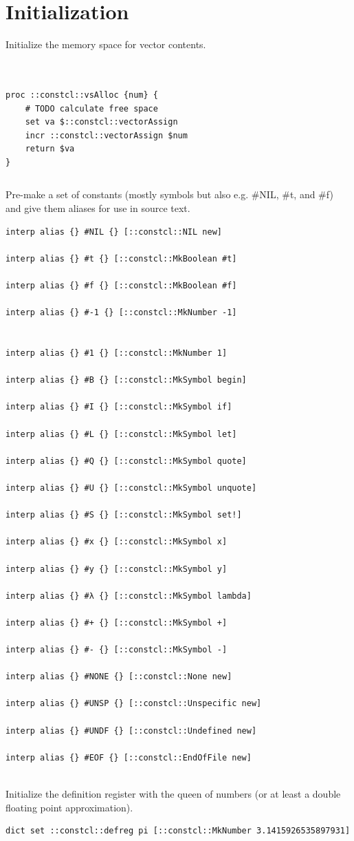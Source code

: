 \documentclass[twoside,9pt]{report}
\begin{document}
\section{Initialization}
\label{initialization}

Initialize the memory space for vector contents.

\noindent\makebox[\linewidth]{\rule{\linewidth}{0.4pt}}
\begin{lstlisting}
 
 
proc ::constcl::vsAlloc {num} {
    # TODO calculate free space
    set va $::constcl::vectorAssign
    incr ::constcl::vectorAssign $num
    return $va
}
\end{lstlisting}
\noindent\makebox[\linewidth]{\rule{\linewidth}{0.4pt}}
\noindent\makebox[\linewidth]{\rule{\linewidth}{0.4pt}}
\begin{lstlisting}
\end{lstlisting}
\noindent\makebox[\linewidth]{\rule{\linewidth}{0.4pt}}

Pre-make a set of constants (mostly symbols but also e.g. \#NIL, \#t, and \#f) and give them aliases for use in source text.

\noindent\makebox[\linewidth]{\rule{\linewidth}{0.4pt}}
\begin{lstlisting}
interp alias {} #NIL {} [::constcl::NIL new]
 
interp alias {} #t {} [::constcl::MkBoolean #t]
 
interp alias {} #f {} [::constcl::MkBoolean #f]
 
interp alias {} #-1 {} [::constcl::MkNumber -1]
 
 
interp alias {} #1 {} [::constcl::MkNumber 1]
 
interp alias {} #B {} [::constcl::MkSymbol begin]
 
interp alias {} #I {} [::constcl::MkSymbol if]
 
interp alias {} #L {} [::constcl::MkSymbol let]
 
interp alias {} #Q {} [::constcl::MkSymbol quote]
 
interp alias {} #U {} [::constcl::MkSymbol unquote]
 
interp alias {} #S {} [::constcl::MkSymbol set!]
 
interp alias {} #x {} [::constcl::MkSymbol x]
 
interp alias {} #y {} [::constcl::MkSymbol y]
 
interp alias {} #λ {} [::constcl::MkSymbol lambda]
 
interp alias {} #+ {} [::constcl::MkSymbol +]
 
interp alias {} #- {} [::constcl::MkSymbol -]
 
interp alias {} #NONE {} [::constcl::None new]
 
interp alias {} #UNSP {} [::constcl::Unspecific new]
 
interp alias {} #UNDF {} [::constcl::Undefined new]
 
interp alias {} #EOF {} [::constcl::EndOfFile new]
 
\end{lstlisting}
\noindent\makebox[\linewidth]{\rule{\linewidth}{0.4pt}}

Initialize the definition register with the queen of numbers (or at least a double floating point approximation).

\noindent\makebox[\linewidth]{\rule{\linewidth}{0.4pt}}
\begin{lstlisting}
dict set ::constcl::defreg pi [::constcl::MkNumber 3.1415926535897931]
\end{lstlisting}
\noindent\makebox[\linewidth]{\rule{\linewidth}{0.4pt}}
\end{document}
